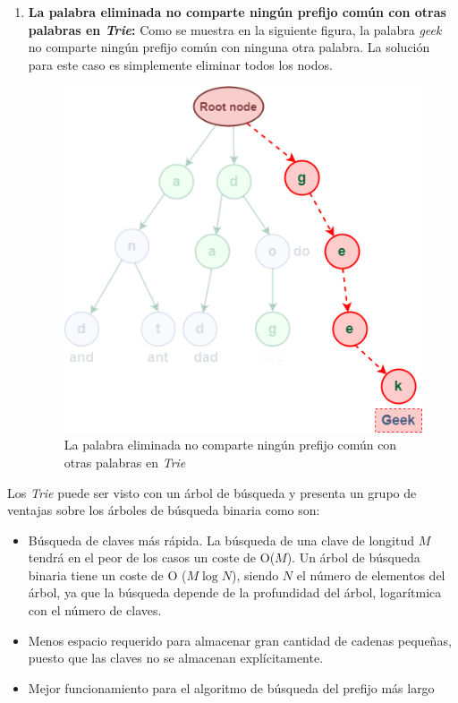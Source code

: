 \begin{enumerate}
	\item \textbf{La palabra eliminada no comparte ningún prefijo común con otras palabras en \emph{Trie}:} Como se muestra en la siguiente figura, la palabra \emph{geek} no comparte ningún prefijo común con ninguna otra palabra. La solución para este caso es simplemente eliminar todos los nodos.
	
			\begin{figure}[h!]
			\centering
			\includegraphics[width=0.35\linewidth]{img/case3_delete}
			\caption{La palabra eliminada no comparte ningún prefijo común con otras palabras en \emph{Trie}}
			\label{fig:case1delete3}
		\end{figure}
\end{enumerate}


Los \emph{Trie} puede ser visto con un árbol de búsqueda y presenta un grupo de ventajas sobre los árboles de búsqueda binaria  como son:

\begin{itemize}
	\item Búsqueda de claves más rápida. La búsqueda de una clave de longitud $M$ tendrá en el peor de los casos un coste de O($M$). Un árbol de búsqueda binaria tiene un coste de O ($M\log N$), siendo $N$ el número de elementos del árbol, ya que la búsqueda depende de la profundidad del árbol, logarítmica con el número de claves.
	\item Menos espacio requerido para almacenar gran cantidad de cadenas pequeñas, puesto que las claves no se almacenan explícitamente.
	\item Mejor funcionamiento para el algoritmo de búsqueda del prefijo más largo
\end{itemize} 